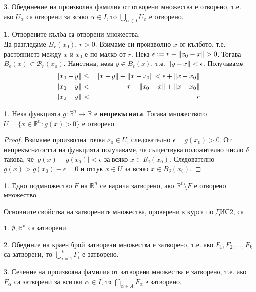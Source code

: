 \documentclass[11pt]{article}
\numberwithin{equation}{section}
\numberwithin{figure}{section}
\numberwithin{table}{section}
\theoremstyle{plain}
\theoremstyle{definition}
\newtheorem{defn}[thm]{\protect\definitionname}
\theoremstyle{remark}
\theoremstyle{definition}
\theoremstyle{remark}
\theoremstyle{plain}
\theoremstyle{definition}
\theoremstyle{definition}
\newtheorem{example}[thm]{\protect\examplename}
\theoremstyle{plain}
\theoremstyle{plain}
\theoremstyle{plain}
\theoremstyle{definition}
\theoremstyle{plain}
\providecommand{\definitionname}{Дефиниция}
\providecommand{\examplename}{Пример}
\DeclarePairedDelimiter\norm{\lVert}{\rVert}
\newcommand*{\B}{\mathcal{B}}
\newcommand*{\R}{\mathbb{R}}
\begin{document}
3. Обединение на произволна фамилия от отворени множества е отворено, т.е. ако $U_\alpha$ са отворени за всяко $\alpha \in I$, то $\bigcup _{\alpha \in I} U_\alpha$ е отворено.

\begin{example}
Отворените кълба са отворени множества.\\
Да разгледаме $B_r(x_0)$, $r>0$. Взимаме си произволно $x$ от кълбото, т.е. растоянието между $x$ и $x_0$ е по-малко от $r$. Нека $\epsilon := r - \norm{x_0-x}>0$. Тогава $B_\epsilon(x)\subset\B_r(x_0)$. Наистина, нека $y\in B_\epsilon(x)$, т.е. $\norm{y-x} <\epsilon$. Получаваме
\begin{eqnarray*}
\norm{x_0-y} &\leq& \norm{x-y} + \norm{x-x_0} < \epsilon + \norm{x-x_0}\\
\norm{x_0-y} &<& r - \norm{x_0-x} + \norm{x-x_0}\\
\norm{x_0-y} &<& r
\end{eqnarray*}
\end{example}

\begin{example}
Нека функцията  $g:\R^n \rightarrow \R$ е \textbf{непрекъсната}. Тогава множеството \\ $U = \{x\in\R^n:g(x)>0\}$ е отворено.
\begin{proof}
Взимаме произволна точка $x_0\in U$, следователно $\epsilon = g(x_0)>0$. От непрекъснатостта на функцията получаваме, че съществува положително число $\delta$ такова, че $|g(x)-g(x_0)|<\epsilon$ за всяко $x\in B_\delta(x_0)$. Следователно $g(x)>g(x_0)-\epsilon = 0$ и оттук $x \in U$ за всяко $x\in B_\delta(x_0)$.
\end{proof}
\end{example}

\begin{defn} Едно подмножество
$F$ на $\R^n $ се нарича затворено, ако $\R^n \setminus F$ е отворено множество.
\end{defn}

Основните свойства на затворените множества, проверени в курса по ДИС2, са

1. $\emptyset, \R^n$ са затворени.

2. Обединие на краен брой затворени множества е затворено, т.е. ако $F_1, F_2, ..., F_k$ са затворени, то $\bigcup_{i=1}^k F_i$ е затворено.

3. Сечение на произволна фамилия от затворени множества е затворено, т.е. ако $F_\alpha$ са затворени за всички $\alpha \in I$, то $\bigcap _{\alpha \in A} F_\alpha$ е затворено.
\end{document}

